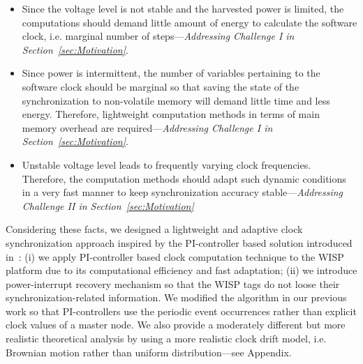 \documentclass[10pt,journal,compsoc]{IEEEtran}
\begin{document}
\begin{itemize}
	\item Since the voltage level is not stable and the harvested power is limited, the computations should demand little amount of energy to calculate the software clock, i.e. marginal number of steps---\emph{Addressing Challenge I in Section~\ref{sec:Motivation}}.
	
	\item Since power is intermittent, the number of variables pertaining to the software clock should be marginal so that saving the state of the synchronization to non-volatile memory will demand little time and less energy. Therefore, lightweight computation methods in terms of main memory overhead are required---\emph{Addressing Challenge I in Section~\ref{sec:Motivation}}.
	
	\item Unstable voltage level leads to frequently varying clock frequencies. Therefore, the computation methods should adapt such dynamic conditions in a very fast manner to keep synchronization accuracy stable---\emph{Addressing Challenge II in Section~\ref{sec:Motivation}}
\end{itemize}

Considering these facts, we designed a lightweight and adaptive clock synchronization approach inspired by the PI-controller based solution introduced in~\cite{pi2015,yildirim2017adaptive}: (i) we apply PI-controller based clock computation technique to the WISP platform due to its computational efficiency and fast adaptation; (ii) we introduce power-interrupt recovery mechanism so that the WISP tags do not loose their synchronization-related information. We modified the algorithm in our previous work so that PI-controllers use the periodic event occurrences rather than explicit clock values of a master node. We also provide a moderately different but more realistic theoretical analysis by using a more realistic clock drift model, i.e. Brownian motion rather than uniform distribution---see Appendix.
\end{document}
